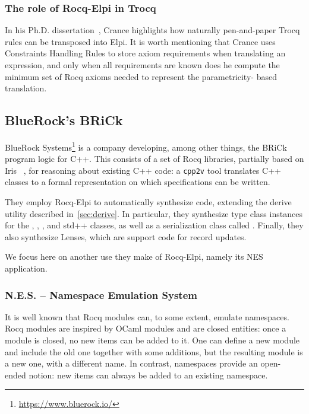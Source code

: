\documentclass[a4paper, 11pt]{book}
\begin{document}
\subsubsection{The role of Rocq-Elpi in Trocq}

In his Ph.D. dissertation~\cite[Page 115]{enzo}, Crance highlights how naturally
pen-and-paper Trocq rules can be transposed into Elpi. It is worth mentioning
that Crance uses Constraints Handling Rules to store axiom requirements when
translating an expression, and only when all requirements are known does he
compute the minimum set of Rocq axioms needed to represent the parametricity-
based translation.



\subsection{BlueRock's BRiCk}


BlueRock Systems\footnote{\url{https://www.bluerock.io/}} is a company
developing, among other things, the BRiCk program logic for C++. This consists
of a set of Rocq libraries, partially based on Iris
~\cite{10.1145/2676726.2676980,10.1007/978-3-662-54434-1_26}, for reasoning
about existing C++ code: a \texttt{cpp2v} tool translates C++ classes to a
formal representation on which specifications can be written.

They employ Rocq-Elpi to automatically synthesize code, extending the derive
utility described in~\cref{sec:derive}. In particular, they synthesize type
class instances for the , , ,
and  std++ classes, as well as a serialization class called
. Finally, they also synthesize Lenses, which are support code for
record updates.

We focus here on another use they make of Rocq-Elpi, namely its NES
application.

\subsubsection{N.E.S. -- Namespace Emulation System}

It is well known that Rocq modules can, to some extent, emulate namespaces.
Rocq modules are inspired by OCaml modules and are closed entities: once a
module is closed, no new items can be added to it. One can define a new module
and include the old one together with some additions, but the resulting module
is a new one, with a different name. In contrast, namespaces provide an open-
ended notion: new items can always be added to an existing namespace.
\end{document}
